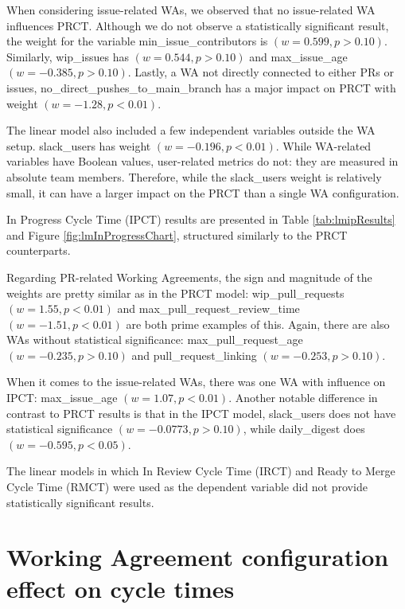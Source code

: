 When considering issue-related WAs, we observed that no issue-related WA influences PRCT. Although we do not observe a statistically significant result, the weight for the variable min\_issue\_contributors is $(w=0.599,p>0.10)$. Similarly, wip\_issues has $(w=0.544,p>0.10)$ and max\_issue\_age $(w=-0.385,p>0.10)$. Lastly, a WA not directly connected to either PRs or issues, no\_direct\_pushes\_to\_main\_branch has a major impact on PRCT with weight $(w=-1.28,p<0.01)$.

The linear model also included a few independent variables outside the WA setup. slack\_users has weight $(w=-0.196,p<0.01)$. While WA-related variables have Boolean values, user-related metrics do not: they are measured in absolute team members. Therefore, while the slack\_users weight is relatively small, it can have a larger impact on the PRCT than a single WA configuration.





In Progress Cycle Time (IPCT) results are presented in Table \ref{tab:lmipResults} and Figure \ref{fig:lmInProgressChart}, structured similarly to the PRCT counterparts.

Regarding PR-related Working Agreements, the sign and magnitude of the weights are pretty similar as in the PRCT model: wip\_pull\_requests $(w=1.55, p<0.01)$ and max\_pull\_request\_review\_time $(w=-1.51, p<0.01)$ are both prime examples of this. Again, there are also WAs without statistical significance: max\_pull\_request\_age $(w=-0.235, p>0.10)$ and pull\_request\_linking $(w=-0.253, p>0.10)$. 



When it comes to the issue-related WAs, there was one WA with influence on IPCT: max\_issue\_age $(w=1.07, p<0.01)$. Another notable difference in contrast to PRCT results is that in the IPCT model, slack\_users does not have statistical significance $(w=-0.0773, p>0.10)$, while daily\_digest does $(w=-0.595, p<0.05)$.



The linear models in which In Review Cycle Time (IRCT) and Ready to Merge Cycle Time (RMCT) were used as the dependent variable did not provide statistically significant results.

\section{Working Agreement configuration effect on cycle times}

